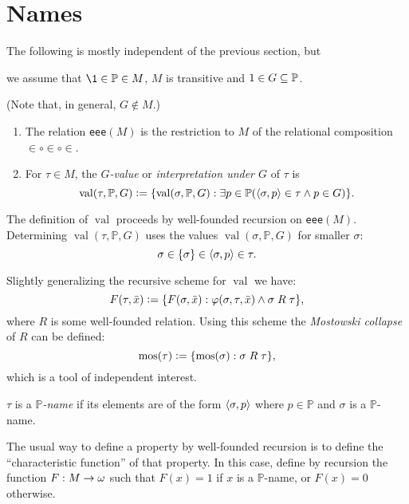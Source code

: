 \documentclass[11pt,english]{article}
\renewcommand{\PP}{\mathbb{P}}
\DeclareMathOperator{\val}{val}
\begin{document}
\section{Names}
\begin{framed}
  The following is mostly independent of the previous section, but %
  \begin{bfseries}%
    we assume that $\1\in\PP\in M$, $M$ is transitive and 
    $1\in G\sbq\PP$.
  \end{bfseries}
  (Note that, in general, $G\notin M$.)
\end{framed}

\begin{definition}
  \begin{enumerate}
  \item The relation \verb|eee|$(M)$ is the restriction to $M$ of the
    relational composition 
    ${\in}\circ{\in}\circ{\in}$. 
  \item For $\tau\in M$, the \emph{$G$-value} or \emph{interpretation
    under $G$} of $\tau$ is
    \[
    \val(\tau,\PP,G)\defi \{\val(\sigma,\PP,G) : \exists p\in \PP
    (\lb\sigma,p\rb\in\tau \y p\in G)\}.
    \]
  \end{enumerate}
\end{definition}

The definition of $\val$ proceeds by well-founded recursion on
\verb|eee|$(M)$. Determining  $\val(\tau,\PP,G)$ uses the values
$\val(\sigma,\PP,G)$ for smaller $\sigma$:
\[
\sigma\in\{\sigma\}\in\langle\sigma,p\rangle\in\tau.
\]

\begin{remark}
  Slightly generalizing the recursive scheme for $\val$ we have:
  \[
  F(\tau,\bar{x})\mathrel{\mathop:}= \{F(\sigma,\bar{x}) : \varphi(\sigma,\tau,\bar{x}) \wedge
  \sigma\mathrel{R}\tau\}, 
  \]
  where $R$ is some well-founded relation. Using this scheme the
  \emph{Mostowski collapse} of $R$ can be defined:
  \[
  \operatorname{mos}(\tau)\mathrel{\mathop:}= \{\operatorname{mos}(\sigma) : \sigma\mathrel{R}\tau\},
  \]
  which is a tool of independent interest.
\end{remark}

\begin{definition}
  $\tau$ is a \emph{$\PP$-name} if its elements are of the form
  $\langle\sigma,p\rangle$ where $p\in\PP$ and $\sigma$ is a $\PP$-name.
\end{definition}
The usual way to define a property by well-founded recursion is to
define the ``characteristic function'' of that property. In this case,
define by recursion the function $F:M\to\omega$ such that $F(x)=1$  if
$x$ is a $\PP$-name, or $F(x)=0$ otherwise.
\end{document}
